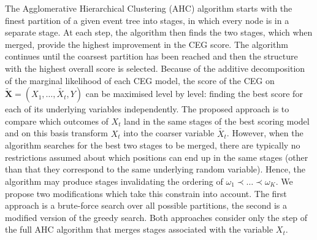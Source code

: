\documentclass[runningheads]{llncs}
\begin{document}
The Agglomerative Hierarchical Clustering (AHC) algorithm starts with the finest partition of a given event tree into stages, in which every node is in a separate stage. At each step, the algorithm then finds the two stages, which when merged, provide the highest improvement in the CEG score. The algorithm continues until the coarsest partition has been reached and then the structure with the highest overall score is selected. Because of the additive decomposition of the marginal likelihood of each CEG model, the score of the CEG on $\boldsymbol{\tilde{X}} = (X_1, \ldots, \tilde{X_t}, Y)$ can be maximised level by level: finding the best score for each of its underlying variables independently. The proposed approach is to compare which outcomes of $X_t$ land in the same stages of the best scoring model and on this basis transform $X_t$ into the coarser variable $\tilde{X_t}$. However, when the algorithm searches for the best two stages to be merged, there are typically no restrictions assumed about which positions can end up in the same stages (other than that they correspond to the same underlying random variable). Hence, the algorithm may produce stages invalidating the ordering of $\omega_1\prec\ldots\prec\omega_K$. We propose two modifications which take this constrain into account. The first approach is a brute-force search over all possible partitions, the second is a modified version of the greedy search. Both approaches consider only the step of the full AHC algorithm that merges stages associated with the variable $X_t$.
\end{document}

